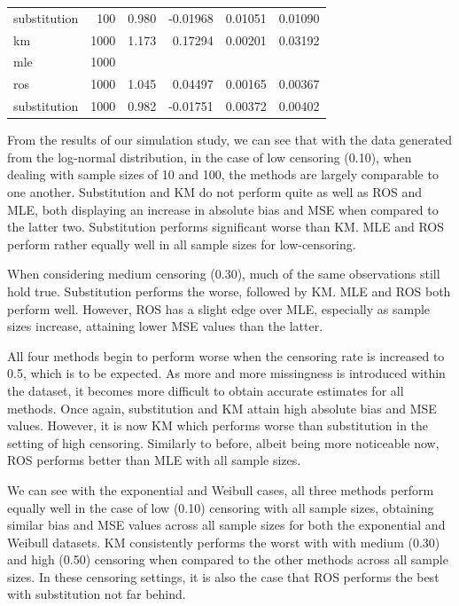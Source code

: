 \documentclass[12pt, twoside]{amherstthesis}
\begin{document}
\begin{table}
\begin{tabular}[t]{lrrrrr}
\hspace{1em}substitution & 100 & 0.980 & -0.01968 & 0.01051 & 0.01090\\
\hspace{1em}km & 1000 & 1.173 & 0.17294 & 0.00201 & 0.03192\\
\hspace{1em}mle & 1000 &  &  &  & \\
\hspace{1em}ros & 1000 & 1.045 & 0.04497 & 0.00165 & 0.00367\\
\hspace{1em}substitution & 1000 & 0.982 & -0.01751 & 0.00372 & 0.00402\\
\bottomrule
\end{tabular}
\end{table}
From the results of our simulation study, we can see that with the data generated from the log-normal distribution, in the case of low censoring (0.10), when dealing with sample sizes of 10 and 100, the methods are largely comparable to one another. Substitution and KM do not perform quite as well as ROS and MLE, both displaying an increase in absolute bias and MSE when compared to the latter two. Substitution performs significant worse than KM. MLE and ROS perform rather equally well in all sample sizes for low-censoring.

When considering medium censoring (0.30), much of the same observations still hold true. Substitution performs the worse, followed by KM. MLE and ROS both perform well. However, ROS has a slight edge over MLE, especially as sample sizes increase, attaining lower MSE values than the latter.

All four methods begin to perform worse when the censoring rate is increased to 0.5, which is to be expected. As more and more missingness is introduced within the dataset, it becomes more difficult to obtain accurate estimates for all methods. Once again, substitution and KM attain high absolute bias and MSE values. However, it is now KM which performs worse than substitution in the setting of high censoring. Similarly to before, albeit being more noticeable now, ROS performs better than MLE with all sample sizes.

We can see with the exponential and Weibull cases, all three methods perform equally well in the case of low (0.10) censoring with all sample sizes, obtaining similar bias and MSE values across all sample sizes for both the exponential and Weibull datasets. KM consistently performs the worst with with medium (0.30) and high (0.50) censoring when compared to the other methods across all sample sizes. In these censoring settings, it is also the case that ROS performs the best with substitution not far behind.
\end{document}
